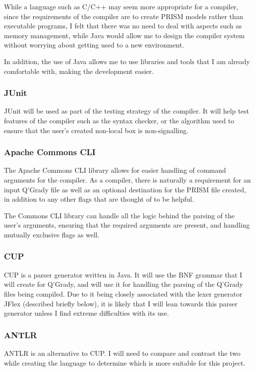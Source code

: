 \documentclass[11pt, a4paper]{article}
\begin{document}
While a language such as C/C++ may seem more appropriate for a compiler, since
the requirements of the compiler are to create PRISM models rather than
executable programs, I felt that there was no need to deal with aspects such as
memory management, while Java would allow me to design the compiler system
without worrying about getting used to a new environment.

In addition, the use of Java allows me to use libraries and tools that I am
already comfortable with, making the development easier.
\subsubsection{JUnit} %
\label{ssub:junit}
JUnit will be used as part of the testing strategy of the compiler. It will help
test features of the compiler such as the syntax checker, or the algorithm used
to ensure that the user's created non-local box is non-signalling.
\subsubsection{Apache Commons CLI} %
\label{ssub:apache_commons_cli}
The Apache Commons CLI library allows for easier handling of command arguments
for the compiler. As a compiler, there is naturally a requirement for an input
Q'Grady file as well as an optional destination for the PRISM file created, in
addition to any other flags that are thought of to be helpful. 

The Commons CLI library can handle all the logic behind the parsing of the
user's arguments, ensuring that the required arguments are present, and handling
mutually exclusive flags as well.
\subsubsection{CUP} %
CUP is a parser generator written in Java. It will use the BNF grammar that I
will create for Q'Grady, and will use it for handling the parsing of the Q'Grady
files being compiled. Due to it being closely associated with the lexer
generator JFlex (described briefly below), it is likely that I will lean towards
this parser generator unless I find extreme difficulties with its use.
\label{ssub:cup}

\subsubsection{ANTLR} %
ANTLR is an alternative to CUP. I will need to compare and contrast the two
while creating the language to determine which is more suitable for this
project.
\label{ssub:antlr}
\end{document}
